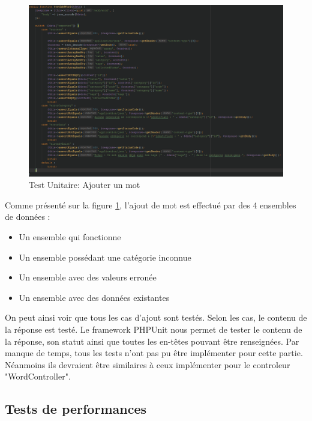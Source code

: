 \documentclass[12pt,a4paper]{article}
\begin{document}
    \begin{figure}[h]
        \centering
        \includegraphics[width=170mm]{img/testaddWord.PNG}
        \caption{Test Unitaire: Ajouter un mot}
        \label{AddWordTest}
    \end{figure}

    Comme présenté sur la figure \ref{AddWordTest}, l'ajout de mot est effectué par des 4 ensembles de données :
    \begin{itemize}
        \item Un ensemble qui fonctionne
        \item Un ensemble possédant une catégorie inconnue
        \item Un ensemble avec des valeurs erronée
        \item Un ensemble avec des données existantes
    \end{itemize}

    On peut ainsi voir que tous les cas d'ajout sont testés. Selon les cas, le contenu de la réponse est testé.
    Le framework PHPUnit nous permet de tester le contenu de la réponse, son statut ainsi que toutes les en-têtes pouvant être renseignées.
    Par manque de temps, tous les tests n'ont pas pu être implémenter pour cette partie. Néanmoins ils devraient être similaires à ceux implémenter pour le controleur "WordController".

    \subsection{Tests de performances}
\end{document}
